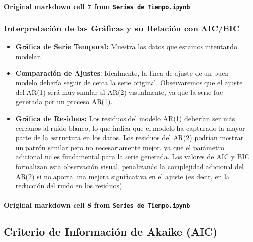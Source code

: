 \documentclass[
  11pt,
]{article}
\providecommand{\tightlist}{%
  \setlength{\itemsep}{0pt}\setlength{\parskip}{0pt}}
\begin{document}
\paragraph{\texorpdfstring{Original markdown cell 7 from \texttt{Series\ de\ Tiempo.ipynb}}{Original markdown cell 7 from Series de Tiempo.ipynb}}\label{original-markdown-cell-7-from-series-de-tiempoipynb}

\subsubsection{Interpretación de las Gráficas y su Relación con AIC/BIC}\label{interpretaciuxf3n-de-las-gruxe1ficas-y-su-relaciuxf3n-con-aicbic}

\begin{itemize}
\tightlist
\item
  \textbf{Gráfica de Serie Temporal:} Muestra los datos que estamos intentando modelar.
\item
  \textbf{Comparación de Ajustes:} Idealmente, la línea de ajuste de un buen modelo debería seguir de cerca la serie original. Observaremos que el ajuste del AR(1) será muy similar al AR(2) visualmente, ya que la serie fue generada por un proceso AR(1).
\item
  \textbf{Gráfica de Residuos:} Los residuos del modelo AR(1) deberían ser más cercanos al ruido blanco, lo que indica que el modelo ha capturado la mayor parte de la estructura en los datos. Los residuos del AR(2) podrían mostrar un patrón similar pero no necesariamente mejor, ya que el parámetro adicional no es fundamental para la serie generada. Los valores de AIC y BIC formalizan esta observación visual, penalizando la complejidad adicional del AR(2) si no aporta una mejora significativa en el ajuste (es decir, en la reducción del ruido en los residuos).
\end{itemize}

\paragraph{\texorpdfstring{Original markdown cell 8 from \texttt{Series\ de\ Tiempo.ipynb}}{Original markdown cell 8 from Series de Tiempo.ipynb}}\label{original-markdown-cell-8-from-series-de-tiempoipynb}

\subsection{Criterio de Información de Akaike (AIC)}\label{criterio-de-informaciuxf3n-de-akaike-aic}
\end{document}
